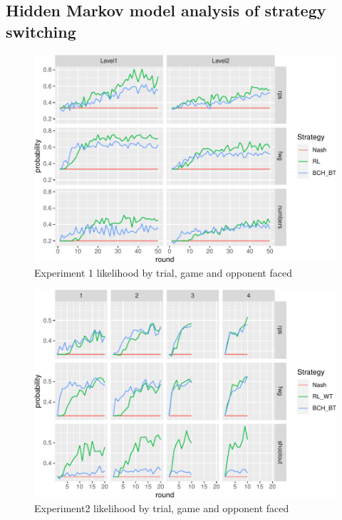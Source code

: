 \documentclass[smallextended]{svjour3}       %
\begin{document}
\hypertarget{hidden-markov-model-analysis-of-strategy-switching}{%
\subsection{Hidden Markov model analysis of strategy
switching}\label{hidden-markov-model-analysis-of-strategy-switching}}

\begin{figure}

{\centering \includegraphics[width=\textwidth]{CBB_v2_files/figure-latex/exp1-lik-by-tr-1} 

}

\caption{Experiment 1 likelihood by trial, game and opponent faced}\label{fig:exp1-lik-by-tr}
\end{figure}

\begin{figure}

{\centering \includegraphics[width=\textwidth]{CBB_v2_files/figure-latex/exp2-lik-by-tr-1} 

}

\caption{Experiment2 likelihood by trial, game and opponent faced}\label{fig:exp2-lik-by-tr}
\end{figure}
\end{document}
